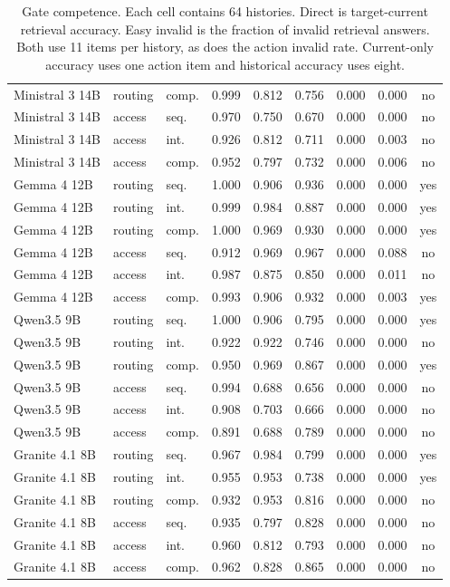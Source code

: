 \begin{table}[t]
\begin{tabular}{@{}lllrrrrrc@{}}
Ministral 3 14B & routing & comp. & 0.999 & 0.812 & 0.756 & 0.000 & 0.000 & no \\
Ministral 3 14B & access & seq. & 0.970 & 0.750 & 0.670 & 0.000 & 0.000 & no \\
Ministral 3 14B & access & int. & 0.926 & 0.812 & 0.711 & 0.000 & 0.003 & no \\
Ministral 3 14B & access & comp. & 0.952 & 0.797 & 0.732 & 0.000 & 0.006 & no \\
Gemma 4 12B & routing & seq. & 1.000 & 0.906 & 0.936 & 0.000 & 0.000 & yes \\
Gemma 4 12B & routing & int. & 0.999 & 0.984 & 0.887 & 0.000 & 0.000 & yes \\
Gemma 4 12B & routing & comp. & 1.000 & 0.969 & 0.930 & 0.000 & 0.000 & yes \\
Gemma 4 12B & access & seq. & 0.912 & 0.969 & 0.967 & 0.000 & 0.088 & no \\
Gemma 4 12B & access & int. & 0.987 & 0.875 & 0.850 & 0.000 & 0.011 & no \\
Gemma 4 12B & access & comp. & 0.993 & 0.906 & 0.932 & 0.000 & 0.003 & yes \\
Qwen3.5 9B & routing & seq. & 1.000 & 0.906 & 0.795 & 0.000 & 0.000 & yes \\
Qwen3.5 9B & routing & int. & 0.922 & 0.922 & 0.746 & 0.000 & 0.000 & no \\
Qwen3.5 9B & routing & comp. & 0.950 & 0.969 & 0.867 & 0.000 & 0.000 & yes \\
Qwen3.5 9B & access & seq. & 0.994 & 0.688 & 0.656 & 0.000 & 0.000 & no \\
Qwen3.5 9B & access & int. & 0.908 & 0.703 & 0.666 & 0.000 & 0.000 & no \\
Qwen3.5 9B & access & comp. & 0.891 & 0.688 & 0.789 & 0.000 & 0.000 & no \\
Granite 4.1 8B & routing & seq. & 0.967 & 0.984 & 0.799 & 0.000 & 0.000 & yes \\
Granite 4.1 8B & routing & int. & 0.955 & 0.953 & 0.738 & 0.000 & 0.000 & yes \\
Granite 4.1 8B & routing & comp. & 0.932 & 0.953 & 0.816 & 0.000 & 0.000 & no \\
Granite 4.1 8B & access & seq. & 0.935 & 0.797 & 0.828 & 0.000 & 0.000 & no \\
Granite 4.1 8B & access & int. & 0.960 & 0.812 & 0.793 & 0.000 & 0.000 & no \\
Granite 4.1 8B & access & comp. & 0.962 & 0.828 & 0.865 & 0.000 & 0.000 & no \\
\bottomrule
\end{tabular}
\caption{Gate competence. Each cell contains 64 histories. Direct is target-current retrieval accuracy. Easy invalid is the fraction of invalid retrieval answers. Both use 11 items per history, as does the action invalid rate. Current-only accuracy uses one action item and historical accuracy uses eight.}
\label{tab:gate}
\end{table}
